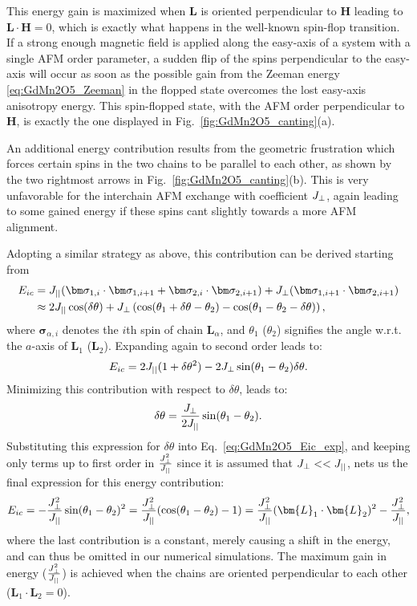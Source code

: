 This energy gain is maximized when $\bm{L}$ is oriented perpendicular to $\bm{H}$ leading to $\bm L \cdot \bm H = 0$, which is exactly what happens in the well-known spin-flop transition.
If a strong enough magnetic field is applied along the easy-axis of a system with a single AFM order parameter, a sudden flip of the spins perpendicular to the easy-axis will occur as soon as the possible gain from the Zeeman energy \eqref{eq:GdMn2O5_Zeeman} in the flopped state overcomes the lost easy-axis anisotropy energy. This spin-flopped state, with the AFM order perpendicular to $\bm{H}$, is exactly the one displayed in Fig.~\ref{fig:GdMn2O5_canting}(a).

An additional energy contribution results from the geometric frustration which forces certain spins in the two chains to be parallel to each other, as shown by the two rightmost arrows in Fig.~\ref{fig:GdMn2O5_canting}(b).
This is very unfavorable for the interchain AFM exchange with coefficient $J_{\perp}$, again leading to some gained energy if these spins cant slightly towards a more AFM alignment.

Adopting a similar strategy as above, this contribution can be derived starting from
\begin{align}
	E_{ic} &= \Jpar (\bm \sigma_{1, i} \cdot \bm \sigma_{1, i+1} + \bm \sigma_{2, i} \cdot \bm \sigma_{2, i+1}) + \Jperp(\bm \sigma_{1, i+1} \cdot \bm \sigma_{2,i+1}) \\
	 &\approx 2 \Jpar \cos(\delta \theta) + \Jperp \left(\cos(\theta_1 + \delta \theta - \theta_2) - \cos(\theta_1 - \theta_2 -\delta \theta)\right),
\end{align}
where $\bm \sigma_{\alpha, i}$ denotes the $i$th spin of chain $\bm L_\alpha$, and $\theta_1$ ($\theta_2$) signifies the angle w.r.t. the $a$-axis of $\bm{L}_1$ ($\bm{L}_2$).
Expanding again to second order leads to:
\begin{equation}
	E_{ic} = 2 J_{||} ( 1+ \delta \theta^2) - 2 J_{\perp} \sin(\theta_1 - \theta_2)\delta \theta. \label{eq:GdMn2O5_Eic_exp}
\end{equation}
Minimizing this contribution with respect to $\delta \theta$, leads to:
\begin{equation}
	\delta \theta = \frac{J_{\perp}}{2 J_{||}} \sin(\theta_1 - \theta_2).
\end{equation}
Substituting this expression for $\delta \theta$ into Eq.~\eqref{eq:GdMn2O5_Eic_exp}, and keeping only terms up to first order in $\frac{J_{\perp}^2}{J_{||}}$ since it is assumed that $J_{\perp} << J_{||}$, nets us the final expression for this energy contribution:
\begin{equation}
	E_{ic} = -\frac{\Jperp^2}{\Jpar}\sin(\theta_1 - \theta_2)^2 =  \frac{\Jperp^2}{\Jpar}(\cos(\theta_1 - \theta_2) - 1) = \frac{\Jperp^2}{\Jpar}(\bm{L}_1 \cdot \bm{L}_2)^2 - \frac{\Jperp^2}{\Jpar},
\end{equation}
where the last contribution is a constant, merely causing a shift in the energy, and can thus be omitted in our numerical simulations.
The maximum gain in energy ($\frac{J_{\perp}^2}{J_{||}}$) is achieved when the chains are oriented perpendicular to each other ($\bm L_1 \cdot \bm L_2 = 0$).

